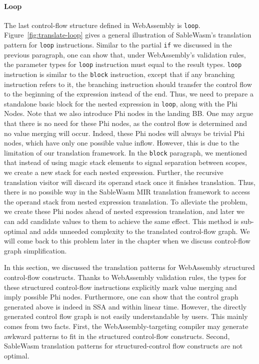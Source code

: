 \paragraph{Loop} The last control-flow structure defined in WebAssembly is \texttt{loop}. Figure~\ref{fig:translate-loop} gives a general illustration of SableWasm's translation pattern for \texttt{loop} instructions. Similar to the partial \texttt{if} we discussed in the previous paragraph, one can show that, under WebAssembly's validation rules, the parameter types for \texttt{loop} instruction must equal to the result types. \texttt{loop} instruction is similar to the \texttt{block} instruction, except that if any branching instruction refers to it, the branching instruction should transfer the control flow to the beginning of the expression instead of the end. Thus, we need to prepare a standalone basic block for the nested expression in \texttt{loop}, along with the Phi Nodes. Note that we also introduce Phi nodes in the landing BB. One may argue that there is no need for these Phi nodes, as the control flow is determined and no value merging will occur. Indeed, these Phi nodes will always be trivial Phi nodes, which have only one possible value inflow. However, this is due to the limitation of our translation framework. In the \texttt{block} paragraph, we mentioned that instead of using magic stack elements to signal separation between scopes, we create a new stack for each nested expression. Further, the recursive translation visitor will discard its operand stack once it finishes translation. Thus, there is no possible way in the SableWasm MIR translation framework to access the operand stack from nested expression translation. To alleviate the problem, we create these Phi nodes ahead of nested expression translation, and later we can add candidate values to them to achieve the same effect. This method is sub-optimal and adds unneeded complexity to the translated control-flow graph. We will come back to this problem later in the chapter when we discuss control-flow graph simplification.

In this section, we discussed the translation patterns for WebAssembly structured control-flow constructs. Thanks to WebAssembly validation rules, the types for these structured control-flow instructions explicitly mark value merging and imply possible Phi nodes. Furthermore, one can show that the control graph generated above is indeed in SSA and within linear time. However, the directly generated control flow graph is not easily understandable by users. This mainly comes from two facts. First, the WebAssembly-targeting compiler may generate awkward patterns to fit in the structured control-flow constructs. Second, SableWasm translation patterns for structured-control flow constructs are not optimal.